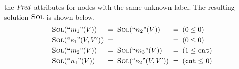 the $\mathit{Pred}$ attributes for nodes with the same unknown label. 
The resulting solution $\textsc{Sol}$ is shown below.
%
\begin{equation*} 
  \begin{array}[t]{l@{\;\;=\;\;}l@{\;\;=\;\;}l}
    \SolutionOf{\unkOf{m_1}(\Vars)} & \SolutionOf{\unkOf{n_2}(\Vars)} &
    (\lintrue)\\[\jot]
    \SolutionOf{\unkOf{e_1}(\Vars,\Vars')}& & (\lintrue) \\[\jot]
    \SolutionOf{\unkOf{m_2}(\Vars)} & \SolutionOf{\unkOf{m_3}(\Vars)} &
    (1 \leq \local) \\[\jot]
    \SolutionOf{\unkOf{n_1}(\Vars)} & \SolutionOf{\unkOf{e_2}(\Vars,\Vars')} & 
    (\local \leq 0) 
  \end{array}
\end{equation*}





